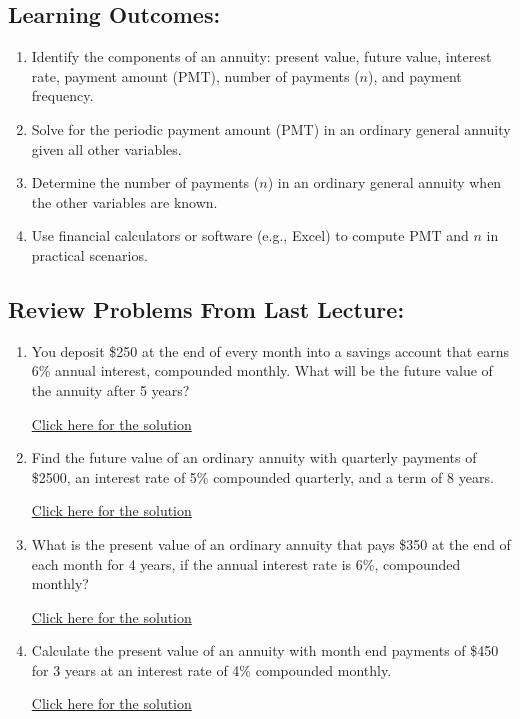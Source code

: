 \documentclass[
]{book}
\providecommand{\tightlist}{%
  \setlength{\itemsep}{0pt}\setlength{\parskip}{0pt}}
\begin{document}
\subsection*{Learning Outcomes:}\label{learning-outcomes-13}

\begin{enumerate}
\def\labelenumi{\arabic{enumi}.}
\tightlist
\item
  Identify the components of an annuity: present value, future value, interest rate, payment amount (PMT), number of payments (\(n\)), and payment frequency.
\item
  Solve for the periodic payment amount (PMT) in an ordinary general annuity given all other variables.
\item
  Determine the number of payments (\(n\)) in an ordinary general annuity when the other variables are known.
\item
  Use financial calculators or software (e.g., Excel) to compute PMT and \(n\) in practical scenarios.
\end{enumerate}

\subsection*{Review Problems From Last Lecture:}\label{review-problems-from-last-lecture-12}

\begin{enumerate}
\def\labelenumi{\arabic{enumi}.}
\tightlist
\item
  You deposit \$250 at the end of every month into a savings account that earns 6\% annual interest, compounded monthly. What will be the future value of the annuity after 5 years?

  \href{https://youtu.be/jIm-SqezwN8}{Click here for the solution}
\item
  Find the future value of an ordinary annuity with quarterly payments of \$2500, an interest rate of 5\% compounded quarterly, and a term of 8 years.

  \href{https://youtu.be/agz1d2ru14s}{Click here for the solution}
\item
  What is the present value of an ordinary annuity that pays \$350 at the end of each month for 4 years, if the annual interest rate is 6\%, compounded monthly?

  \href{https://youtu.be/xs2m_aONP-4}{Click here for the solution}
\item
  Calculate the present value of an annuity with month end payments of \$450 for 3 years at an interest rate of 4\% compounded monthly.

  \href{https://youtu.be/0ReGN005_WE}{Click here for the solution}
\end{enumerate}
\end{document}
